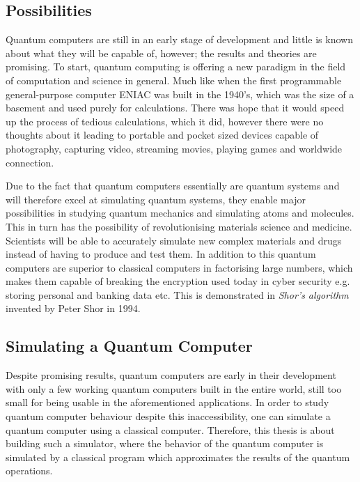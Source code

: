 \subsection{Possibilities}
Quantum computers are still in an early stage of development and little is known about what they will be capable of, however; the results and theories are promising. To start, quantum computing is offering a new paradigm in the field of computation and science in general. Much like when the first programmable general-purpose computer ENIAC was built in the 1940's, which was the size of a basement and used purely for calculations\cite{eniac}. There was hope that it would speed up the process of tedious calculations, which it did, however there were no thoughts about it leading to portable and pocket sized devices capable of photography, capturing video, streaming movies, playing games and worldwide connection. 

Due to the fact that quantum computers essentially are quantum systems and will therefore excel at simulating quantum systems, they enable major possibilities in studying quantum mechanics and simulating atoms and molecules. This in turn has the possibility of revolutionising materials science and medicine. Scientists will be able to accurately simulate new complex materials and drugs instead of having to produce and test them\cite{harvard}. In addition to this quantum computers are superior to classical computers in factorising large numbers, which makes them capable of breaking the encryption used today in cyber security e.g. storing personal and banking data etc. This is demonstrated in \textit{Shor's algorithm} invented by Peter Shor in 1994\cite{niel_chang}.

\subsection{Simulating a Quantum Computer}
Despite promising results, quantum computers are early in their development with only a few working quantum computers built in the entire world, still too small for being usable in the aforementioned applications. In order to study quantum computer behaviour despite this inaccessibility, one can simulate a quantum computer using a classical computer. Therefore, this thesis is about building such a simulator, where the behavior of the quantum computer is simulated by a classical program which approximates the results of the quantum operations. 



